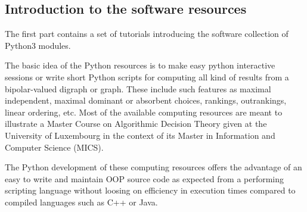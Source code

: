 % 
%
%

\begin{partbacktext}
\part{Introduction to the \Digraph software resources}
\noindent The first part contains a set of tutorials introducing the \Digraph software collection of Python3 modules.

The basic idea of the \Digraph Python resources is to make easy python interactive sessions or write short Python scripts for computing all kind of results from a bipolar-valued digraph or graph. These include such features as maximal independent, maximal dominant or absorbent choices, rankings, outrankings, linear ordering, etc. Most of the available computing resources are meant to illustrate a Master Course on Algorithmic Decision Theory given at the University of Luxembourg in the context of its Master in Information and Computer Science (MICS).

The Python development of these computing resources offers the advantage of an easy to write and maintain OOP source code as expected from a performing scripting language without loosing on efficiency in execution times compared to compiled languages such as C++ or Java.
\end{partbacktext}